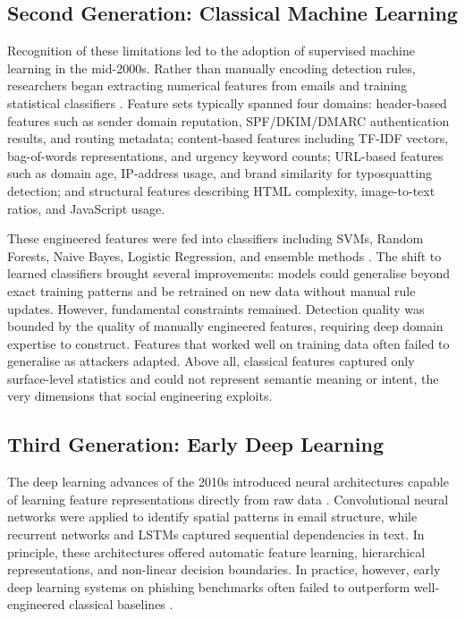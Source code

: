 \subsection{Second Generation: Classical Machine Learning}

Recognition of these limitations led to the adoption of supervised machine learning in the mid-2000s. Rather than manually encoding detection rules, researchers began extracting numerical features from emails and training statistical classifiers \cite{khonji2013phishing}. Feature sets typically spanned four domains: header-based features such as sender domain reputation, \ac{SPF}/\ac{DKIM}/\ac{DMARC} authentication results, and routing metadata; content-based features including \ac{TF-IDF} vectors, bag-of-words representations, and urgency keyword counts; URL-based features such as domain age, IP-address usage, and brand similarity for typosquatting detection; and structural features describing \ac{HTML} complexity, image-to-text ratios, and JavaScript usage.

These engineered features were fed into classifiers including \acp{SVM}, Random Forests, Naive Bayes, Logistic Regression, and ensemble methods \cite{almomani2013survey}. The shift to learned classifiers brought several improvements: models could generalise beyond exact training patterns and be retrained on new data without manual rule updates. However, fundamental constraints remained. Detection quality was bounded by the quality of manually engineered features, requiring deep domain expertise to construct. Features that worked well on training data often failed to generalise as attackers adapted. Above all, classical features captured only surface-level statistics and could not represent semantic meaning or intent, the very dimensions that social engineering exploits.

\subsection{Third Generation: Early Deep Learning}

The deep learning advances of the 2010s introduced neural architectures capable of learning feature representations directly from raw data \cite{electronics13193823}. Convolutional neural networks were applied to identify spatial patterns in email structure, while recurrent networks and LSTMs captured sequential dependencies in text. In principle, these architectures offered automatic feature learning, hierarchical representations, and non-linear decision boundaries. In practice, however, early deep learning systems on phishing benchmarks often failed to outperform well-engineered classical baselines \cite{basnet2008detection}.

